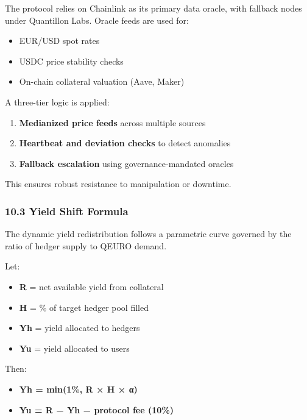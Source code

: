 The protocol relies on Chainlink as its primary data oracle, with
fallback nodes under Quantillon Labs. Oracle feeds are used for:

\begin{itemize}
\item
  EUR/USD spot rates
\item
  USDC price stability checks
\item
  On-chain collateral valuation (Aave, Maker)
\end{itemize}

A three-tier logic is applied:

\begin{enumerate}
\def\labelenumi{\arabic{enumi}.}
\item
  \textbf{Medianized price feeds} across multiple sources
\item
  \textbf{Heartbeat and deviation checks} to detect anomalies
\item
  \textbf{Fallback escalation} using governance-mandated oracles
\end{enumerate}

This ensures robust resistance to manipulation or downtime.

\hypertarget{yield-shift-formula}{%
\subsubsection{10.3 Yield Shift Formula}\label{yield-shift-formula}}

The dynamic yield redistribution follows a parametric curve governed by
the ratio of hedger supply to QEURO demand.

Let:

\begin{itemize}
\item
  \textbf{R} = net available yield from collateral
\item
  \textbf{H} = \% of target hedger pool filled
\item
  \textbf{Yh} = yield allocated to hedgers
\item
  \textbf{Yu} = yield allocated to users
\end{itemize}

Then:

\begin{itemize}
\item
  \textbf{Yh = min(1\%, R × H × α)}
\item
  \textbf{Yu = R − Yh − protocol fee (10\%)}
\end{itemize}

